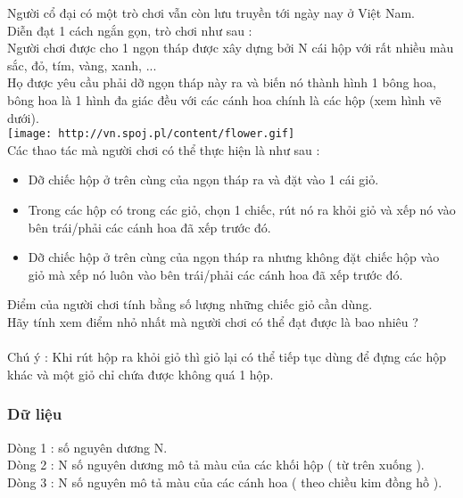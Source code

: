 

                 Người cổ đại có một trò chơi vẫn còn lưu truyền tới ngày nay ở   Việt Nam.   
\\   Diễn đạt 1 cách ngắn gọn, trò chơi như sau :   
\\   Người chơi được cho 1 ngọn tháp được xây dựng bởi N cái   hộp với rất nhiều màu sắc, đỏ, tím, vàng, xanh, ...   
\\   Họ được yêu cầu phải dỡ ngọn tháp này ra và biến nó thành   hình 1 bông hoa, bông hoa là 1 hình đa giác đều với các cánh   hoa chính là các hộp (xem hình vẽ dưới).   
\\
\texttt{[image: http://vn.spoj.pl/content/flower.gif]}
\\

   Các thao tác mà người chơi có thể thực hiện là như sau :   
\\
\begin{itemize}
	\item     Dỡ chiếc hộp ở trên cùng của ngọn tháp ra và đặt vào 1 cái   giỏ.   
	\item     Trong các hộp có trong các giỏ, chọn 1 chiếc, rút nó ra   khỏi giỏ và xếp nó vào bên trái/phải các cánh hoa đã xếp trước   đó.   
	\item     Dỡ chiếc hộp ở trên cùng của ngọn tháp ra nhưng không   đặt chiếc hộp vào giỏ mà xếp nó luôn vào bên trái/phải các   cánh hoa đã xếp trước đó.   
\end{itemize}

   Điểm của người chơi tính bằng số lượng những chiếc giỏ cần   dùng.   
\\   Hãy tính xem điểm nhỏ nhất mà người chơi có thể đạt được là   bao nhiêu ?   
\\
\\       Chú ý      : Khi rút hộp ra khỏi giỏ thì giỏ lại có thể tiếp   tục dùng để đựng các hộp khác và một giỏ chỉ chứa được   không quá 1 hộp.   
\\

\subsubsection{   Dữ liệu  }

   Dòng 1 : số nguyên dương N.   
\\   Dòng 2 : N số nguyên dương mô tả màu của các khối hộp ( từ   trên xuống ).   
\\   Dòng 3 : N số nguyên mô tả màu của các cánh hoa ( theo chiều   kim đồng hồ ).  


